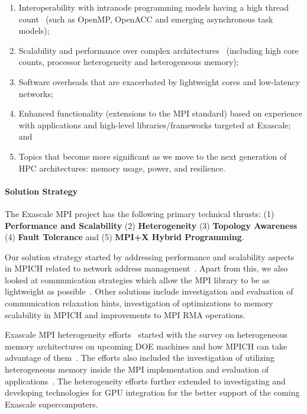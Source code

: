 \begin{enumerate}

\item Interoperability with intranode programming models having a high
  thread count~\cite{Hybrid1, Hybrid2, FT2} (such as OpenMP,
  OpenACC and emerging asynchronous task models);

\item Scalability and performance over complex
  architectures~\cite{Perf1, Perf2, FT2, Perf4} (including high core
  counts, processor heterogeneity and heterogeneous memory);

\item Software overheads that are exacerbated by lightweight cores and
  low-latency networks;

\item Enhanced functionality (extensions to the MPI standard) based on
  experience with applications and high-level libraries/frameworks
  targeted at Exascale; and

\item Topics that become more significant as we move to the next
  generation of HPC architectures: memory usage, power, and
  resilience.

\end{enumerate}

\paragraph{Solution Strategy}

The Exascale MPI project has the following primary technical thrusts:
(1) \textbf{Performance and Scalability} (2) \textbf{Heterogeneity}
(3) \textbf{Topology Awareness} (4) \textbf{Fault Tolerance} and (5)
\textbf{MPI+X Hybrid Programming}.

Our solution strategy started by addressing performance and
scalability aspects in MPICH related to network address
management~\cite{memscal}.  Apart from this, we also looked at
communication strategies which allow the MPI library to be as
lightweight as possible~\cite{ch41, ch42}. Other solutions include
investigation and evaluation of communication relaxation hints,
investigation of optimizations to memory scalability in MPICH and
improvements to MPI RMA operations.

Exascale MPI heterogeneity efforts~\cite{Hetero1, Hetero2, Hetero3}
started with the survey on heterogeneous memory architectures on
upcoming DOE machines and how MPICH can take advantage of
them~\cite{hexe}. The efforts also included the investigation of
utilizing heterogeneous memory inside the MPI implementation and
evaluation of applications~\cite{hetero4}. The heterogeneity efforts
further extended to investigating and developing technologies for GPU
integration for the better support of the coming Exascale
supercomputers.

